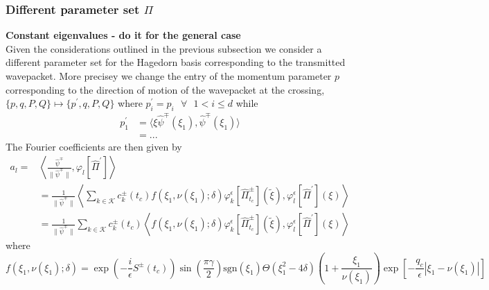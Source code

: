 \subsubsection{Different parameter set $\Pi$}
\textbf{Constant eigenvalues - do it for the general case }
\\
Given the considerations outlined in the previous subsection 
we consider a different parameter set for the Hagedorn basis 
corresponding to the transmitted wavepacket. More precisey we change 
the entry of the momentum parameter $p$ corresponding to the direction of motion 
of the wavepacket at the crossing, 
$\{p, q, P, Q \} \mapsto \{ p^\prime, q, P, Q \} $ where 
$p^\prime_{i} = p_{i} \text{ } \forall \text{ } 1 < i  \leq d$
while
\begin{equation}
  \begin{split}
    p_1^\prime &= \langle \xi \hat{\psi}^\mp(\xi_1), \hat{\psi}^{\mp}(\xi_1) \rangle    
    \\
    &= ...
  \end{split}
\end{equation}
 The Fourier coefficients are then given by 
\begin{equation}
  \begin{split}
    a_l =& \left \langle \frac{\hat{\psi}^\mp}{\|\hat{\psi}^\mp \|} ,
      \varphi_l[\hat{\Pi}^\prime] \right \rangle 
    \\
    &=
    \frac{1}{\|\hat{\psi}^\mp \|}
    \left \langle \sum_{k \in \mathcal{K}}c^{\pm}_{k}(t_c) 
    f(\xi_1, \nu(\xi_1); \delta)
    \varphi_k^\epsilon[\hat{\Pi}^{\pm}_{t_c}](\tilde{\xi}), 
  \varphi_l^\epsilon[\hat{\Pi}^\prime](\xi)  \right \rangle
    \\
    &=
    \frac{1}{\|\hat{\psi}^\mp \|}
    \sum_{k \in \mathcal{K}}c^{\pm}_{k}(t_c)
    \left \langle  
    f(\xi_1, \nu(\xi_1); \delta)
    \varphi_k^\epsilon[\hat{\Pi}^{\pm}_{t_c}](\tilde{\xi}), 
  \varphi_l^\epsilon[\hat{\Pi}^\prime](\xi)  \right \rangle
  \end{split}
\end{equation}
where 
\[
  f(\xi_1, \nu(\xi_1); \delta) 
  =
    \exp{\left(-\frac{i}{\epsilon}S^{\pm}(t_c)\right)}
    \sin \left( \frac{\pi \gamma}{2}  \right) 
    \text{sgn}(\xi_1)
    \Theta(\xi_1^2 - 4\delta) \left(1 + \frac{\xi_1}{\nu(\xi_1)}\right)
    \exp \left[- \frac{q_c}{\epsilon}|\xi_1 - \nu(\xi_1)| \right]
\]
